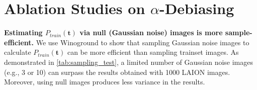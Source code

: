 \documentclass{article} \usepackage{iclr2024_conference,times}
\begin{document}
\section{Ablation Studies on $\alpha$-Debiasing}
\label{app:alpha_ablation}
{\bf Estimating $P_{train}(\textbf{t})$ via null (Gaussian noise) images is more sample-efficient.} We use Winoground to show that sampling Gaussian noise images to calculate $P_{train}(\mathbf{t})$ can be more efficient than sampling trainset images. As demonstrated in \autoref{tab:sampling_test}, a limited number of Gaussian noise images (e.g., 3 or 10) can surpass the results obtained with 1000 LAION images. Moreover, using null images produces less variance in the results.








\begin{table}[h]

\centering
{}
\caption{\small {\bf Comparing sampling of Gaussian noise images and trainset images 
for estimating $P_{train}(\mathbf{t})$.} We report text scores of $\alpha$-debiasing on Winoground I-to-T retrieval task. We ablate 3/10/100/1000 Gaussian noise and LAION samples and report both mean and std using 5 sampling seeds. The optimal $\alpha^{\ast} \in [0, 1]$ is searched on testset via a step size of $0.001$. The Gaussian noise images are sampled with a mean calculated from the LAION subset and a fixed std of $0.25$. }
\label{tab:sampling_test}


\end{table}
\end{document}
